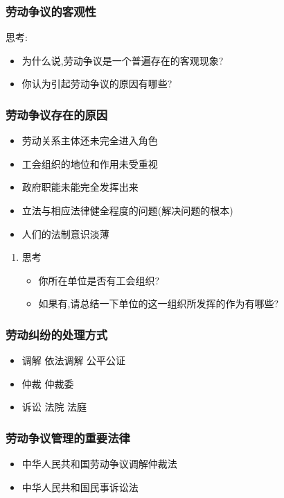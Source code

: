\documentclass{ctexart}
\begin{document}
\subsubsection{劳动争议的客观性}
\label{sec-3-3-2}
思考:
\begin{itemize}
\item 为什么说,劳动争议是一个普遍存在的客观现象?
\item 你认为引起劳动争议的原因有哪些?
\end{itemize}
\subsubsection{劳动争议存在的原因}
\label{sec-3-3-3}
\begin{itemize}
\item 劳动关系主体还未完全进入角色
\item 工会组织的地位和作用未受重视
\item 政府职能未能完全发挥出来
\item 立法与相应法律健全程度的问题(解决问题的根本)
\item 人们的法制意识淡薄
\end{itemize}
\begin{enumerate}
\item 思考
\label{sec-3-3-3-1}
\begin{itemize}
\item 你所在单位是否有工会组织?
\item 如果有,请总结一下单位的这一组织所发挥的作为有哪些?
\end{itemize}
\end{enumerate}
\subsubsection{劳动纠纷的处理方式}
\label{sec-3-3-4}
\begin{itemize}
\item 调解 依法调解 公平公证
\item 仲裁 仲裁委
\item 诉讼 法院 法庭
\end{itemize}
\subsubsection{劳动争议管理的重要法律}
\label{sec-3-3-5}
\begin{itemize}
\item 中华人民共和国劳动争议调解仲裁法
\item 中华人民共和国民事诉讼法
\end{itemize}
\end{document}

